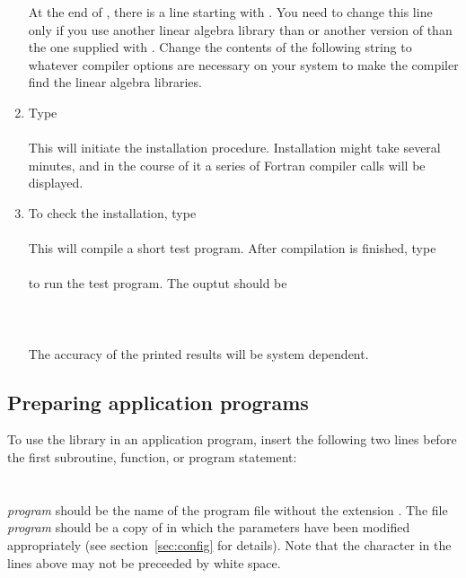 \begin{enumerate}
At the end of , there is a line starting with
. You need to change this line only if you
use another linear algebra library than  or another
version of  than the one supplied with .
Change the contents of the following string to
whatever compiler options are necessary on your system to make the
compiler find the linear algebra libraries.

\item
Type\\
\wsp{}\\
This will initiate the installation procedure. Installation might take several
minutes, and in the course of it a series of Fortran compiler calls will
be displayed.

\item
To check the installation, type\\
\wsp{}\\
This will compile a short test program. After
compilation is finished, type\\
\wsp{}\\
to run the test program. The ouptut should be\\
\wsp{}\\
\wsp{}\\
\wsp{}\\
The accuracy of the printed results will be system dependent.

\end{enumerate}

\subsection{Preparing application programs}

To use the library in an application program, insert the following two lines
before the first subroutine, function, or program statement:\\
\wsp{}\\\
\wsp{}\\
{\em program} should be the name of the program file without the
extension \prog{.f}. The file {\em program}\prog{.h} should be a
copy of \prog{config.h} in which the parameters have been modified
appropriately (see section~\ref{sec:config} for details).
Note that the character \prog{\#} in the lines above may not be
preceeded by white space.

